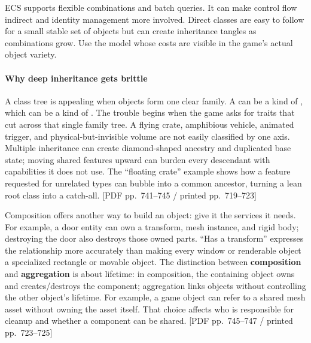 \hypertarget{06-engine-ii-ch041-entity-component-composition-or-direct-objects}{}

ECS supports flexible combinations and batch queries. It can make control flow indirect and identity management more involved. Direct classes are easy to follow for a small stable set of objects but can create inheritance tangles as combinations grow. Use the model whose costs are visible in the game's actual object variety.

\paragraph{Why deep inheritance gets brittle}\label{06-engine-ii-ch041-why-deep-inheritance-gets-brittle}

\hypertarget{06-engine-ii-ch041-why-deep-inheritance-gets-brittle}{}

A class tree is appealing when objects form one clear family. A  can be a kind of , which can be a kind of . The trouble begins when the game asks for traits that cut across that single family tree. A flying crate, amphibious vehicle, animated trigger, and physical-but-invisible volume are not easily classified by one axis. Multiple inheritance can create diamond-shaped ancestry and duplicated base state; moving shared features upward can burden every descendant with capabilities it does not use. The ``floating crate'' example shows how a feature requested for unrelated types can bubble into a common ancestor, turning a lean root class into a catch-all. {[}PDF pp.~741--745 / printed pp.~719--723{]}

Composition offers another way to build an object: give it the services it needs. For example, a door entity can own a transform, mesh instance, and rigid body; destroying the door also destroys those owned parts. ``Has a transform'' expresses the relationship more accurately than making every window or renderable object a specialized rectangle or movable object. The distinction between \textbf{composition} and \textbf{aggregation} is about lifetime: in composition, the containing object owns and creates/destroys the component; aggregation links objects without controlling the other object's lifetime. For example, a game object can refer to a shared mesh asset without owning the asset itself. That choice affects who is responsible for cleanup and whether a component can be shared. {[}PDF pp.~745--747 / printed pp.~723--725{]}

